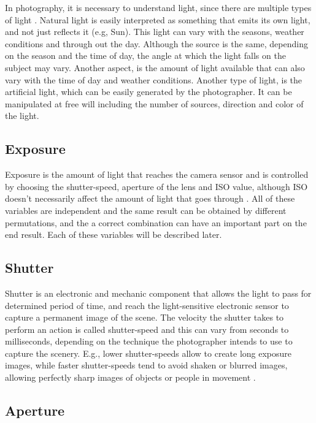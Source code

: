 In photography, it is necessary to understand light, since there are multiple types of light \cite{Santos}. Natural light is easily interpreted as something that emits its own light, and not just reflects it (e.g, Sun). This light can vary with the seasons, weather conditions and through out the day. Although the source is the same, depending on the season and the time of day, the angle at which the light falls on the subject may vary. Another aspect, is the amount of light available that can also vary with the time of day and weather conditions.
Another type of light, is the artificial light, which can be easily generated by the photographer. It can be manipulated at free will including the number of sources, direction and color of the light.


\subsection{Exposure}
\label{sub:exposure}

Exposure is the amount of light that reaches the camera sensor and is controlled by choosing the shutter-speed, aperture of the lens and ISO value, although ISO doesn't necessarily affect the amount of light that goes through \cite{Kamps2012, Santos}. All of these variables are independent and the same result can be obtained by different permutations, and the a correct combination can have an important part on the end result. Each of these variables will be described later.

\subsection{Shutter}
\label{sub:shutter}

Shutter is an electronic and mechanic component that allows the light to pass for determined period of time, and reach the light-sensitive electronic sensor to capture a permanent image of the scene. The velocity the shutter takes to perform an action is called shutter-speed and this can vary from seconds to milliseconds, depending on the technique the photographer intends to use to capture the scenery. E.g., lower shutter-speeds allow to create long exposure images, while faster shutter-speeds tend to avoid shaken or blurred images, allowing perfectly sharp images of objects or people in movement \cite{Santos}.

\subsection{Aperture}
\label{sub:aperture}

